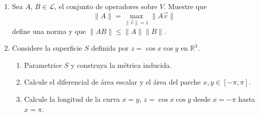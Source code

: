 \documentclass[12pt]{article}
\begin{document}
\begin{enumerate}
\vspace{1cm}

\item[\textbf{Problema 3}] Sea \(A\), \(B \in \mathcal{L}\), el conjunto de operadores sobre \(V\). Muestre que 
\[
\|A\| = \max_{\|\vec{v}\|=1} \|A\vec{v}\|
\]
define una norma y que \(\|AB\| \leq \|A\|\|B\|\).

\vspace{1cm}

\item[\textbf{Problema 4}] Considere la superficie \(S\) definida por \(z = \cos x \cos y\) en \(\mathbb{R}^3\).

\begin{enumerate}
    \item[a)] Parametrice \(S\) y construya la métrica inducida.
    \item[b)] Calcule el diferencial de área escalar y el área del parche \(x,y \in [-\pi, \pi]\).
    \item[c)] Calcule la longitud de la curva \(x = y\), \(z = \cos x \cos y\) desde \(x = -\pi\) hasta \(x = \pi\).
\end{enumerate}

\end{enumerate}
\end{document}
